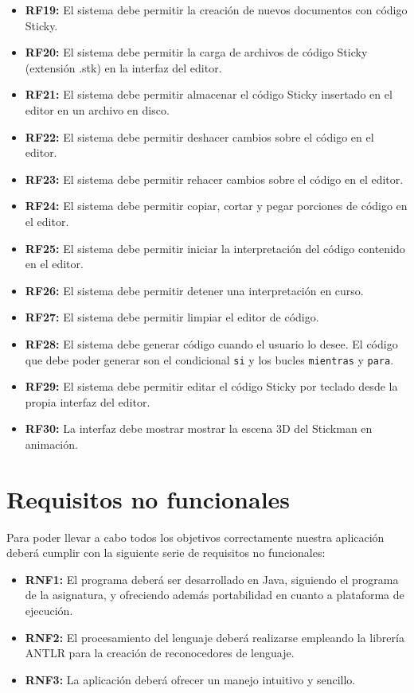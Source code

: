       \begin{itemize}
      \item \textbf{RF19:} El sistema debe permitir la creación de nuevos documentos con código Sticky.
      \item \textbf{RF20:} El sistema debe permitir la carga de archivos de código Sticky (extensión .stk) en la interfaz del editor.
      \item \textbf{RF21:} El sistema debe permitir almacenar el código Sticky insertado en el editor en un archivo en disco.
      \item \textbf{RF22:} El sistema debe permitir deshacer cambios sobre el código en el editor.
      \item \textbf{RF23:} El sistema debe permitir rehacer cambios sobre el código en el editor.
      \item \textbf{RF24:} El sistema debe permitir copiar, cortar y pegar porciones de código en el editor.
      \item \textbf{RF25:} El sistema debe permitir iniciar la interpretación del código contenido en el editor.
      \item \textbf{RF26:} El sistema debe permitir detener una interpretación en curso.
      \item \textbf{RF27:} El sistema debe permitir limpiar el editor de código.
      \item \textbf{RF28:} El sistema debe generar código cuando el usuario lo desee. El código que debe poder generar son el condicional \texttt{si} y los bucles \texttt{mientras} y \texttt{para}.
      \item \textbf{RF29:} El sistema debe permitir editar el código Sticky por teclado desde la propia interfaz del editor.
      \item \textbf{RF30:} La interfaz debe mostrar mostrar la escena 3D del Stickman en animación.
      \end{itemize}
   
   \section{Requisitos no funcionales}
   Para poder llevar a cabo todos los objetivos correctamente nuestra aplicación deberá cumplir con la siguiente serie de requisitos no funcionales:
   \begin{itemize}
      \item \textbf{RNF1:} El programa deberá ser desarrollado en Java, siguiendo el programa de la asignatura, y ofreciendo además
            portabilidad en cuanto a plataforma de ejecución.
      \item \textbf{RNF2:} El procesamiento del lenguaje deberá realizarse empleando la librería ANTLR para la creación de reconocedores de lenguaje.
      \item \textbf{RNF3:} La aplicación deberá ofrecer un manejo intuitivo y sencillo.
   \end{itemize}
